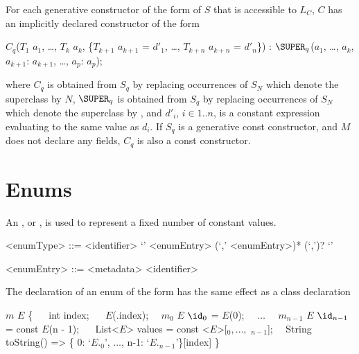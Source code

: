 \documentclass[makeidx]{article}
\begin{document}
\LMHash{}%
For each generative constructor of the form  of $S$ that is accessible to $L_C$, $C$ has an implicitly declared constructor of the form

\begin{normativeDartCode}
$C_q$($T_{1}$ $a_{1}$, \ldots , $T_{k}$ $a_{k}$, \{$T_{k+1}$ $a_{k+1}$ = $d'_1$, \ldots , $T_{k+n}$ $a_{k+n}$ = $d'_n$\})
    : $\SUPER_q$($a_{1}$, \ldots , $a_{k}$, $a_{k+1}$: $a_{k+1}$, \ldots, $a_p$: $a_p$);
\end{normativeDartCode}

\noindent
where $C_q$ is obtained from $S_q$ by replacing occurrences of $S_N$
which denote the superclass by $N$,
$\SUPER_q$ is obtained from $S_q$ by replacing occurrences of $S_N$
which denote the superclass by \SUPER{},
and $d'_i$, $i \in 1..n$, is a constant expression evaluating to the same value as $d_i$.
If $S_q$ is a generative const constructor, and $M$ does not declare any
fields, $C_q$ is also a const constructor.


\section{Enums}

\LMHash{}%
An , or , is used to represent a fixed number of constant values.

\begin{grammar}
<enumType> ::= \ENUM{} <identifier>
  \gnewline{} `{' <enumEntry> (`,' <enumEntry>)* (`,')? `}'

<enumEntry> ::= <metadata> <identifier>
\end{grammar}

\LMHash{}%
The declaration of an enum of the form
has the same effect as a class declaration

\begin{normativeDartCode}
$m$ \CLASS{} $E$ \{
\ \ \FINAL{} int index;
\ \ \CONST{} $E$(\THIS{}.index);
\ \ $m_0$ \STATIC{} \CONST{} $E$ $\id_0$ = \CONST{} $E$(0);
\ \ $\ldots$
\ \ $m_{n-1}$ \STATIC{} \CONST{} $E$ $\id_{n-1}$ = const $E$(n - 1);
\ \ \STATIC{} \CONST{} List<$E$> values = const <$E$>[\id$_0, \ldots, $ \id$_{n-1}$];
\ \ String toString() => \{ 0: `$E$.\id$_0$', $\ldots$, n-1: `$E$.\id$_{n-1}$'\}[index]
\}
\end{normativeDartCode}
\end{document}
